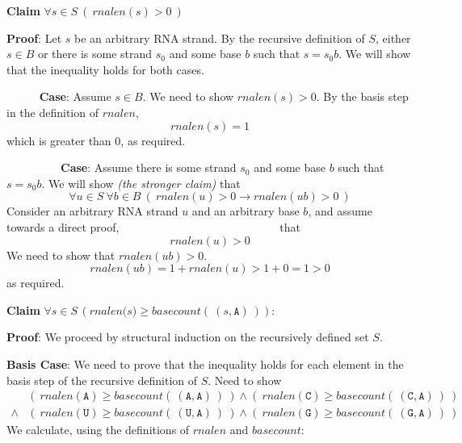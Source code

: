 \documentclass[12pt, oneside]{article}
\newcommand{\A}[0]{\texttt{A}}
\newcommand{\C}[0]{\texttt{C}}
\newcommand{\G}[0]{\texttt{G}}
\newcommand{\U}[0]{\texttt{U}}
\begin{document}
{\bf Claim} $\forall s \in S ~(~rnalen(s) > 0~)$

{\bf Proof}: Let $s$ be an arbitrary RNA strand. By the recursive definition of $S$,
either $s \in B$ or there is some strand $s_0$ and some base $b$ such that $s = s_0 b$.
We will show that the inequality holds for both cases.

{$\phantom{Basis}$} {\bf Case}: Assume $s \in B$. We need to show $rnalen(s) > 0$. 
By the basis step in the definition of $rnalen$,
$$rnalen(s) = 1$$
which is greater than $0$, as required.

{$\phantom{Recursive}$} {\bf Case}: Assume there is some strand $s_0$ and some base $b$ 
such that $s = s_0 b$. We will show {\it (the stronger claim)} that 
\[
    \forall u \in S ~\forall b \in B ~( ~\textit{rnalen}(u) >0  \to 
    \textit{rnalen}(ub) >0 ~)
\]
Consider an arbitrary RNA strand $u$ and an arbitrary base $b$, and assume towards a
direct proof,$~~{\phantom{ this is the induction hypothesis}}~~$ that
\[
    rnalen(u) > 0
\]
We need to show that $rnalen(ub) > 0$.
\[
    rnalen(ub) = 1 + rnalen (u) > 1 + 0 = 1 > 0
\]
as required. 

     \newpage


{\bf Claim} $\forall s \in S \, (\textit{rnalen(s)} \geq \textit{basecount}(~(s, \A)~))$:

{\bf Proof}: We proceed by structural induction on the recursively defined set $S$.

{\bf Basis  Case}: We need to prove that 
the inequality holds for each element in the basis step of the recursive
definition of $S$. 
Need to show 
\begin{align*}
          &(~ rnalen(\A) \geq basecount(~(\A, \A)~)~) \land (~ rnalen(\C) \geq basecount(~(\C, \A)~)~) \\
    \land & (~ rnalen(\U) \geq basecount(~(\U, \A)~)~) \land (~ rnalen(\G) \geq basecount(~(\G, \A)~)~)
\end{align*}
We calculate, using the definitions of $rnalen$ and $basecount$:
\end{document}
